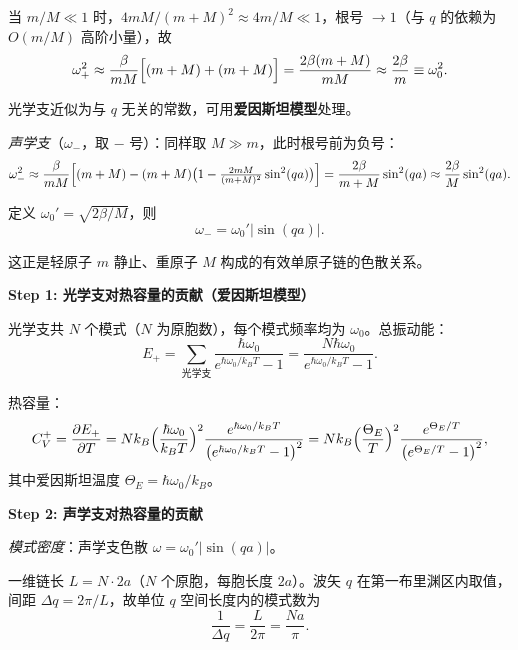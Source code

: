 \begin{derivationbox}[标准解题过程]
当 $m/M\ll1$ 时，$4mM/(m+M)^2\approx4m/M\ll1$，根号 $\to 1$（与 $q$ 的依赖为 $O(m/M)$ 高阶小量），故
\begin{equation}
\omega_+^2\approx\frac{\beta}{mM}\Bigl[(m+M)+(m+M)\Bigr]=\frac{2\beta(m+M)}{mM}\approx\frac{2\beta}{m}\equiv\omega_0^2.
\end{equation}

光学支近似为与 $q$ 无关的常数，可用\textbf{爱因斯坦模型}处理。

\textit{声学支}（$\omega_-$，取 $-$ 号）：同样取 $M\gg m$，此时根号前为负号：
\begin{equation}
\omega_-^2\approx\frac{\beta}{mM}\Bigl[(m+M)-(m+M)\bigl(1-\tfrac{2mM}{(m+M)^2}\sin^2(qa)\bigr)\Bigr]
=\frac{2\beta}{m+M}\sin^2(qa)\approx\frac{2\beta}{M}\sin^2(qa).
\end{equation}

定义 $\omega_0'=\sqrt{2\beta/M}$，则
\begin{equation}
\omega_-=\omega_0'|\sin(qa)|.
\end{equation}

这正是轻原子 $m$ 静止、重原子 $M$ 构成的有效单原子链的色散关系。

\textbf{Step 1: 光学支对热容量的贡献（爱因斯坦模型）}

光学支共 $N$ 个模式（$N$ 为原胞数），每个模式频率均为 $\omega_0$。总振动能：
\begin{equation}
E_+=\sum_{\text{光学支}}\frac{\hbar\omega_0}{e^{\hbar\omega_0/k_BT}-1}
=\frac{N\hbar\omega_0}{e^{\hbar\omega_0/k_BT}-1}.
\end{equation}

热容量：
\begin{equation}
C_V^+=\frac{\partial E_+}{\partial T}
=Nk_B\Bigl(\frac{\hbar\omega_0}{k_BT}\Bigr)^2\frac{e^{\hbar\omega_0/k_BT}}{\bigl(e^{\hbar\omega_0/k_BT}-1\bigr)^2}
=Nk_B\Bigl(\frac{\Theta_E}{T}\Bigr)^2\frac{e^{\Theta_E/T}}{\bigl(e^{\Theta_E/T}-1\bigr)^2},
\end{equation}
其中爱因斯坦温度 $\Theta_E=\hbar\omega_0/k_B$。

\textbf{Step 2: 声学支对热容量的贡献}

\textit{模式密度}：声学支色散 $\omega=\omega_0'|\sin(qa)|$。

一维链长 $L=N\cdot2a$（$N$ 个原胞，每胞长度 $2a$）。波矢 $q$ 在第一布里渊区内取值，间距 $\Delta q=2\pi/L$，故单位 $q$ 空间长度内的模式数为
\begin{equation}
\frac{1}{\Delta q}=\frac{L}{2\pi}=\frac{Na}{\pi}.
\end{equation}


\end{derivationbox}
